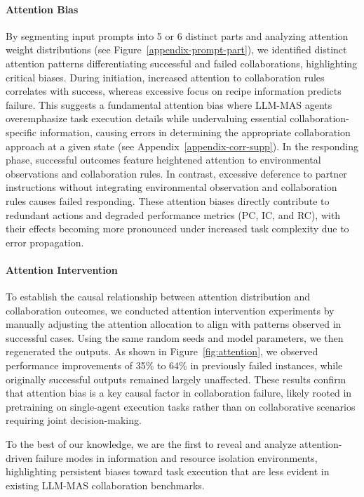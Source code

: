 \documentclass[11pt]{article}
\begin{document}
\paragraph{Attention Bias}

By segmenting input prompts into 5 or 6 distinct parts and analyzing attention weight distributions (see Figure~\ref{appendix-prompt-part}), we identified distinct attention patterns differentiating successful and failed collaborations, highlighting critical biases. During initiation, increased attention to collaboration rules correlates with success, whereas excessive focus on recipe information predicts failure. This suggests a fundamental attention bias where LLM-MAS agents overemphasize task execution details while undervaluing essential collaboration-specific information, causing errors in determining the appropriate collaboration approach at a given state (see Appendix~\ref{appendix-corr-supp}). In the responding phase, successful outcomes feature heightened attention to environmental observations and collaboration rules. In contrast, excessive deference to partner instructions without integrating environmental observation and collaboration rules causes failed responding. These attention biases directly contribute to redundant actions and degraded performance metrics (PC, IC, and RC), with their effects becoming more pronounced under increased task complexity due to error propagation.




\paragraph{Attention Intervention}
To establish the causal relationship between attention distribution and collaboration outcomes, we conducted attention intervention experiments by manually adjusting the attention allocation to align with patterns observed in successful cases. Using the same random seeds and model parameters, we then regenerated the outputs. As shown in Figure~\ref{fig:attention}, we observed performance improvements of 35\% to 64\% in previously failed instances, while originally successful outputs remained largely unaffected. These results confirm that attention bias is a key causal factor in collaboration failure, likely rooted in pretraining on single-agent execution tasks rather than on collaborative scenarios requiring joint decision-making. 


To the best of our knowledge, we are the first to reveal and analyze attention-driven failure modes in information and resource isolation environments, highlighting persistent biases toward task execution that are less evident in existing LLM-MAS collaboration benchmarks.
\end{document}
